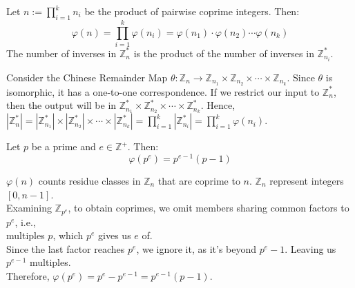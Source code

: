\begin{theo}

    \label{theo:chinese_remainder_phi}

    Let $n:=\prod_{i=1}^k n_i$ be the product of pairwise coprime integers. Then:
    \[ \varphi(n) = \prod_{i=1}^k \varphi(n_i) = \varphi(n_1)\cdot\varphi(n_2)\cdots\varphi(n_k)\]
    \noindent
    The number of inverses in $\mathbb{Z}_n^*$ is the product of the number of inverses in $\mathbb{Z}_{n_i}^*$.
\end{theo}
\begin{Proof}
    Consider the Chinese Remainder Map $\theta:\mathbb{Z}_n\to\mathbb{Z}_{n_1}\times\mathbb{Z}_{n_2}\times\cdots\times\mathbb{Z}_{n_k}$.
    Since $\theta$ is isomorphic, it has a one-to-one correspondence. If we restrict our input to $\mathbb{Z}_n^*$, then the output will be in $\mathbb{Z}_{n_1}^*\times\mathbb{Z}_{n_2}^*\times\cdots\times\mathbb{Z}_{n_k}^*$.
    Hence, $|\mathbb{Z}_n^*|=|\mathbb{Z}_{n_1}^*|\times|\mathbb{Z}_{n_2}^*|\times\cdots\times|\mathbb{Z}_{n_k}^*|=\prod_{i=1}^k|\mathbb{Z}_{n_i}^*|=\prod_{i=1}^k\varphi(n_i)$.

\end{Proof}
\begin{theo}

    Let $p$ be a prime and $e\in\mathbb{Z^+}$. Then:
    \[\varphi(p^e)=p^{e-1}(p-1)\]
\end{theo}
\begin{Proof}
    
    $\varphi(n)$ counts residue classes in $\mathbb{Z}_n$ that are coprime to $n$. $\mathbb{Z}_n$ represent integers $[0, n-1]$.\\

    \noindent
    Examining $\mathbb{Z}_{p^e}$, to obtain coprimes, we omit members sharing common factors to $p^e$, i.e.,\\
    multiples $p$, which $p^e$ gives us $e$ of.\\

    \noindent
    Since the last factor reaches $p^e$, we ignore it, as it's beyond $p^e-1$. Leaving us $p^{e-1}$ multiples.\\
    Therefore, $\varphi(p^e)=p^e-p^{e-1}=p^{e-1}(p-1)$.
    
\end{Proof}

